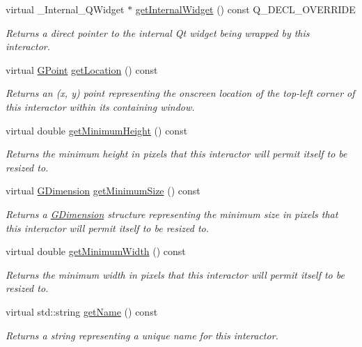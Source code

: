 \begin{DoxyCompactItemize}
virtual \+\_\+\+Internal\+\_\+\+Q\+Widget $\ast$ \mbox{\hyperlink{classGButton_a208ce13c1da40bf0ddb509daf99d6588}{get\+Internal\+Widget}} () const Q\+\_\+\+D\+E\+C\+L\+\_\+\+O\+V\+E\+R\+R\+I\+DE
\begin{DoxyCompactList}\small\item\em Returns a direct pointer to the internal Qt widget being wrapped by this interactor. \end{DoxyCompactList}\item 
virtual \mbox{\hyperlink{classGPoint}{G\+Point}} \mbox{\hyperlink{classGInteractor_a4f83802015511edeb63b892830812c11}{get\+Location}} () const
\begin{DoxyCompactList}\small\item\em Returns an (x, y) point representing the onscreen location of the top-\/left corner of this interactor within its containing window. \end{DoxyCompactList}\item 
virtual double \mbox{\hyperlink{classGInteractor_aed4b0075fcc434499c3cb3e46896bda3}{get\+Minimum\+Height}} () const
\begin{DoxyCompactList}\small\item\em Returns the minimum height in pixels that this interactor will permit itself to be resized to. \end{DoxyCompactList}\item 
virtual \mbox{\hyperlink{classGDimension}{G\+Dimension}} \mbox{\hyperlink{classGInteractor_a66b5af0b32493b4d597ca0a3df2049ea}{get\+Minimum\+Size}} () const
\begin{DoxyCompactList}\small\item\em Returns a \mbox{\hyperlink{classGDimension}{G\+Dimension}} structure representing the minimum size in pixels that this interactor will permit itself to be resized to. \end{DoxyCompactList}\item 
virtual double \mbox{\hyperlink{classGInteractor_a59e668114fe3d49d2a0f28deb258f7c8}{get\+Minimum\+Width}} () const
\begin{DoxyCompactList}\small\item\em Returns the minimum width in pixels that this interactor will permit itself to be resized to. \end{DoxyCompactList}\item 
virtual std\+::string \mbox{\hyperlink{classGInteractor_a8a60438a5b55d0b2ceb35c8674b9d8c5}{get\+Name}} () const
\begin{DoxyCompactList}\small\item\em Returns a string representing a unique name for this interactor. \end{DoxyCompactList}\item 

\end{DoxyCompactItemize}
